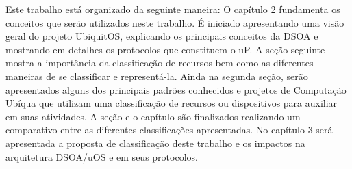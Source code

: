 Este trabalho está organizado da seguinte maneira: O capítulo 2 fundamenta os conceitos que serão utilizados neste trabalho. É iniciado apresentando uma visão geral do projeto UbiquitOS, explicando os principais conceitos da DSOA e mostrando em detalhes os protocolos que constituem o uP. A seção seguinte mostra a importância da classificação de recursos bem como as diferentes maneiras de se classificar e representá-la. Ainda na segunda seção, serão apresentados alguns dos principais padrões conhecidos e projetos de Computação Ubíqua que utilizam uma classificação de recursos ou dispositivos para auxiliar em suas atividades. A seção e o capítulo são finalizados realizando um comparativo entre as diferentes classificações apresentadas. No capítulo 3 será apresentada a
proposta de classificação deste trabalho e os impactos na arquitetura DSOA/uOS e em seus protocolos.
